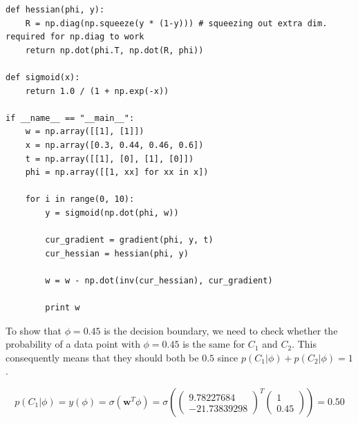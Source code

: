 \documentclass[paper=a4, fontsize=10pt]{scrartcl} %
\numberwithin{equation}{section} %
\numberwithin{figure}{section} %
\numberwithin{table}{section} %
\begin{document}
\begin{enumerate}
\begin{verbatim}
def hessian(phi, y):
    R = np.diag(np.squeeze(y * (1-y))) # squeezing out extra dim. required for np.diag to work
    return np.dot(phi.T, np.dot(R, phi))

def sigmoid(x):
    return 1.0 / (1 + np.exp(-x))

if __name__ == "__main__":
    w = np.array([[1], [1]])
    x = np.array([0.3, 0.44, 0.46, 0.6])
    t = np.array([[1], [0], [1], [0]])
    phi = np.array([[1, xx] for xx in x])

    for i in range(0, 10):
        y = sigmoid(np.dot(phi, w))

        cur_gradient = gradient(phi, y, t)
        cur_hessian = hessian(phi, y)

        w = w - np.dot(inv(cur_hessian), cur_gradient)

        print w
		\end{verbatim}

		To show that $\phi = 0.45$ is the decision boundary, we need to check whether the probability of a data point with $\phi = 0.45$ is the same for $C_1$ and $C_2$. This consequently means that they should both be $0.5$ since $p(C_1 \vert \phi) + p(C_2 \vert \phi) = 1$.

		\begin{equation}
			p(C_1 \vert \phi) = y(\phi) = \sigma (\boldsymbol w^T \phi) = \sigma (\begin{pmatrix} 9.78227684 \\ -21.73839298 \end{pmatrix}^T \begin{pmatrix} 1\\0.45 \end{pmatrix}) = 0.50
		\end{equation}
\end{enumerate}
\end{document}
